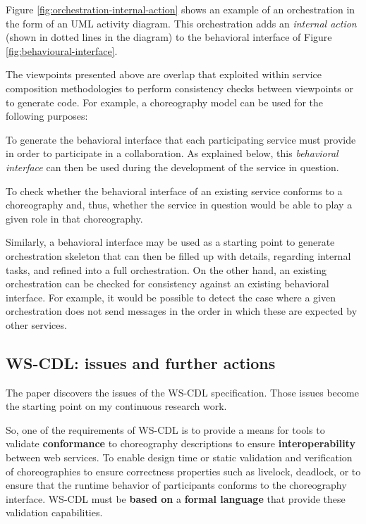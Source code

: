 Figure \ref{fig:orchestration-internal-action} shows an example of an orchestration in the form of an UML activity diagram. This orchestration adds an\textit{ internal action }(shown in dotted lines in the diagram) to the behavioral interface of Figure \ref{fig:behavioural-interface}.

The viewpoints presented above are overlap that exploited within service composition methodologies to perform consistency checks between viewpoints or to generate code. For example, a choreography model can be used for the following purposes:

\begin{compactenum}
\item  To generate the behavioral interface that each participating service must provide in order to participate in a collaboration. As explained below, this \textit{behavioral interface }can then be used during the development of the service in question.

\item  To check whether the behavioral interface of an existing service conforms to a choreography and, thus, whether the service in question would be able to play a given role in that choreography.
\end{compactenum}

Similarly, a behavioral interface may be used as a starting point to generate orchestration skeleton that can then be filled up with details, regarding internal tasks, and refined into a full orchestration. On the other hand, an existing orchestration can be checked for consistency against an existing behavioral interface. For example, it would be possible to detect the case where a given orchestration does not send messages in the order in which these are expected by other services.

\subsection{WS-CDL: issues and further actions}

The paper \cite{critical-ws-cdl} discovers the issues of the WS-CDL specification. Those issues become the starting point on my continuous research work.

So, one of the requirements of WS-CDL is to provide a means for tools to validate \textbf{conformance} to choreography descriptions to ensure \textbf{interoperability} between web services. To enable design time or static validation and verification of choreographies to ensure correctness properties such as livelock, deadlock, or to ensure that the runtime behavior of participants conforms to the choreography interface. WS-CDL must be \textbf{based on} a \textbf{formal language} that provide these validation capabilities.

